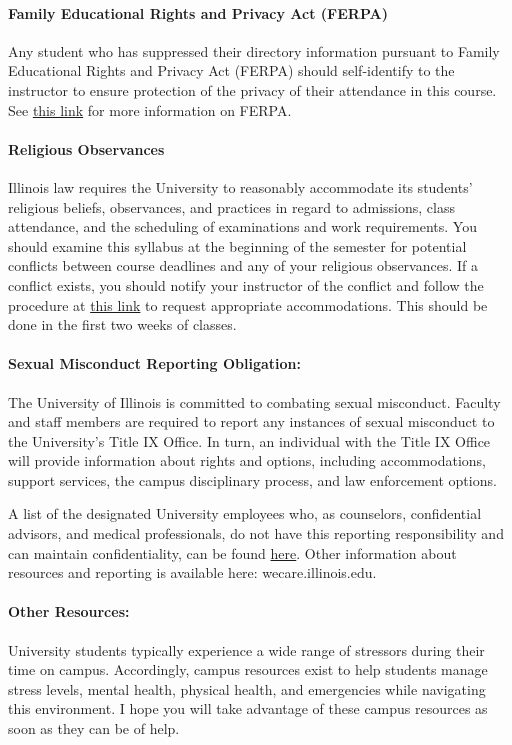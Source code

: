 \documentclass[11pt, a4paper]{article}
\begin{document}
\paragraph{Family Educational Rights and Privacy Act (FERPA)}
Any student who has suppressed their directory information pursuant to Family
Educational Rights and Privacy Act (FERPA) should self-identify to the
instructor to ensure protection of the privacy of their attendance in this
course. See \href{https://registrar.illinois.edu/academic-records/ferpa/}{this
link} for more information on FERPA.

\paragraph{Religious Observances}
Illinois law requires the University to reasonably accommodate its students'
religious beliefs, observances, and practices in regard to admissions, class
attendance, and the scheduling of examinations and work requirements. You
should examine this syllabus at the beginning of the semester for potential
conflicts between course deadlines and any of your religious observances. If a
conflict exists, you should notify your instructor of the conflict and follow
the procedure at
\href{https://odos.illinois.edu/community-of-care/resources/students/religious-observances/}{this
link} to request appropriate accommodations. This should be done in the first two weeks of classes.

\paragraph{Sexual Misconduct Reporting Obligation:} The University of Illinois is committed to combating sexual misconduct. Faculty and staff members are required to report any instances of sexual misconduct to the University’s Title IX Office. In turn, an individual with the Title IX Office will provide information about rights and options, including accommodations, support services, the campus disciplinary process, and law enforcement options.

A list of the designated University employees who, as counselors, confidential
advisors, and medical professionals, do not have this reporting responsibility
and can maintain confidentiality, can be found
\href{https://wecare.illinois.edu/resources/students/#confidential}{here}.
Other information about resources and reporting is available here: wecare.illinois.edu.

\paragraph{Other Resources:}
University students typically experience a wide range of stressors during their
time on campus. Accordingly, campus resources exist to help students manage
stress levels, mental health, physical health, and emergencies while navigating
this environment. I hope you will take advantage of these campus resources as
soon as they can be of help.
\end{document}
